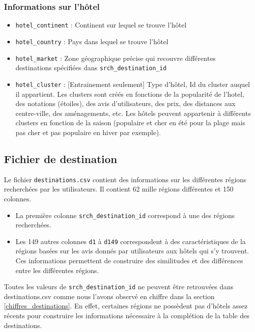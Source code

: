 \subsubsection{Informations sur l'hôtel}

\begin{itemize}[label=$\triangleright$]
	\item \verb|hotel_continent| : Continent sur lequel se trouve l'hôtel
	\item \verb|hotel_country| : Pays dans lequel se trouve l'hôtel
	\item \verb|hotel_market| : Zone géographique précise qui recouvre différentes destinations spécifiées dans \verb|srch_destination_id|
	\item \verb|hotel_cluster| : [Entrainement seulement] Type d'hôtel, Id du cluster auquel il appartient. Les clusters sont créés en fonctions de la popularité de l'hotel, des notations (étoiles), des avis d'utilisateurs, des prix, des distances aux centre-ville, des aménagements, etc. Les hôtels peuvent appartenir à différents clusters en fonction de la saison (populaire et cher en été pour la plage mais pas cher et pas populaire en hiver par exemple).
\end{itemize}

\subsection{Fichier de destination}

Le fichier \verb|destinations.csv| contient des informations sur les différentes régions recherchées par les utilisateurs. Il contient 62 mille régions différentes et 150 colonnes.

\begin{itemize}[label=$\triangleright$]
	\item La première colonne \verb|srch_destination_id| correspond à une des régions recherchées.
	\item Les 149 autres colonnes \verb|d1| à \verb|d149| correspondent à des caractéristiques de la régions basées sur les avis donnés par utilisateurs aux hôtels qui s'y trouvent. Ces informations permettent de construire des similitudes et des différences entre les différentes régions.
\end{itemize}

Toutes les valeurs de \verb|srch_destination_id| ne peuvent être retrouvées dans destinations.csv comme nous l'avons observé en chiffre dans la section \ref{chiffres_destinations}. En effet, certaines régions ne possèdent pas d'hôtels assez récents pour construire les informations nécessaire à la complétion de la table des destinations.

